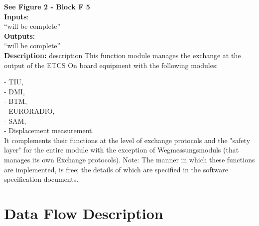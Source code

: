 \documentclass{template/openetcs_report}
\begin{document}
 \textbf{ See Figure 2 - Block F 5}\\
 
 \textbf{Inputs}:\\
``will be complete''\\
 
 \textbf{Outputs:}\\
 ``will be complete''\\
 
 \textbf{Description:} 
 description 
This function module manages the exchange at the output of the ETCS On board equipment with 
the following modules: 

- TIU, \\
- DMI, \\
- BTM, \\
- EURORADIO,\\ 
- SAM, \\
- Displacement measurement. \\

It complements their functions at the level of exchange protocols and the "safety layer" for 
the entire module with the exception of Wegmessungsmoduls (that manages its own 
Exchange protocols). 
Note: The manner in which these functions are implemented, is free; the 
details of which are specified in the software specification documents.\\
 
\chapter{Data Flow Description}
\end{document}
